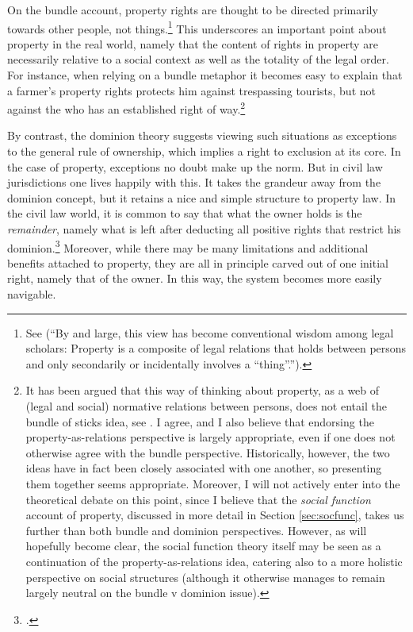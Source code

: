 On the bundle account, property rights are thought to be directed primarily towards other people, not things.\footnote{See \cite[357-358]{merrill01} (``By and large, this view has become conventional wisdom among legal scholars: Property is a composite of legal relations that holds between persons and only secondarily or incidentally involves a ``thing''.'').} This underscores an important point about property in the real world, namely that the content of rights in property are necessarily relative to a social context as well as the totality of the legal order. For instance, when relying on a bundle metaphor it becomes easy to explain that a farmer's property rights protects him against trespassing tourists, but not against the  who has an established right of way.\footnote{It has been argued that this way of thinking about property, as a web of (legal and social) normative relations between persons, does not entail the bundle of sticks idea, see \cite[23-25]{dorfman10}. I agree, and I also believe that endorsing the property-as-relations perspective is largely appropriate, even if one does not otherwise agree with the bundle perspective. Historically, however, the two ideas have in fact been closely associated with one another, so presenting them together seems appropriate. Moreover, I will not actively enter into the theoretical debate on this point, since I believe that the {\it social function} account of property, discussed in more detail in Section \ref{sec:socfunc}, takes us further than both bundle and dominion perspectives. However, as will hopefully become clear, the social function theory itself may be seen as a continuation of the property-as-relations idea, catering also to a more holistic perspective on social structures (although it otherwise manages to remain largely neutral on the bundle v dominion issue).}

By contrast, the dominion theory suggests viewing such situations as exceptions to the general rule of ownership, which implies a right to exclusion at its core. In the case of property, exceptions no doubt make up the norm. But in civil law jurisdictions one lives happily with this. It takes the grandeur away from the dominion concept, but it retains a nice and simple structure to property law. In the civil law world, it is common to say that what the owner holds is the {\it remainder}, namely what is left after deducting all positive rights that restrict his dominion.\footcite[25]{chang12} Moreover, while there may be many limitations and additional benefits attached to property, they are all in principle carved out of one initial right, namely that of the owner. In this way, the system becomes more easily navigable.

